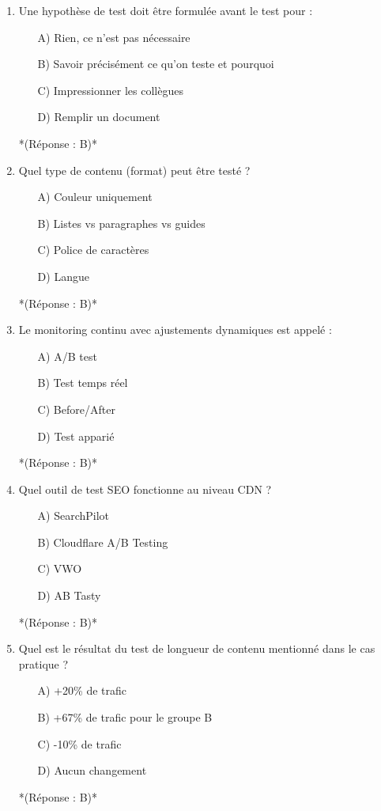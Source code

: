 \documentclass[12pt,a4paper,twoside]{report}
\begin{document}
\begin{enumerate}
    \item Une hypothèse de test doit être formulée avant le test pour :
    \begin{itemize}
        \item[A)] Rien, ce n'est pas nécessaire
        \item[B)] Savoir précisément ce qu'on teste et pourquoi
        \item[C)] Impressionner les collègues
        \item[D)] Remplir un document
    \end{itemize}
    *(Réponse : B)*

    \item Quel type de contenu (format) peut être testé ?
    \begin{itemize}
        \item[A)] Couleur uniquement
        \item[B)] Listes vs paragraphes vs guides
        \item[C)] Police de caractères
        \item[D)] Langue
    \end{itemize}
    *(Réponse : B)*

    \item Le monitoring continu avec ajustements dynamiques est appelé :
    \begin{itemize}
        \item[A)] A/B test
        \item[B)] Test temps réel
        \item[C)] Before/After
        \item[D)] Test apparié
    \end{itemize}
    *(Réponse : B)*

    \item Quel outil de test SEO fonctionne au niveau CDN ?
    \begin{itemize}
        \item[A)] SearchPilot
        \item[B)] Cloudflare A/B Testing
        \item[C)] VWO
        \item[D)] AB Tasty
    \end{itemize}
    *(Réponse : B)*

    \item Quel est le résultat du test de longueur de contenu mentionné dans le cas pratique ?
    \begin{itemize}
        \item[A)] +20\% de trafic
        \item[B)] +67\% de trafic pour le groupe B
        \item[C)] -10\% de trafic
        \item[D)] Aucun changement
    \end{itemize}
    *(Réponse : B)*


\end{enumerate}
\end{document}
